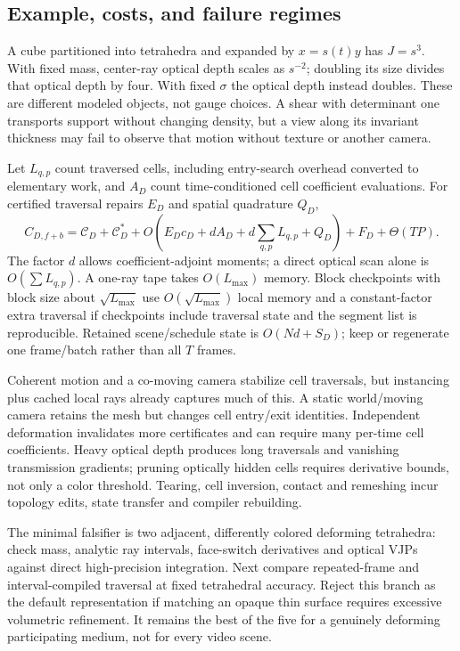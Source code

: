 \documentclass[10pt,letterpaper]{article}
\theoremstyle{remark}\newtheorem{counterexample}[proposition]{Counterexample}
\newcommand{\cost}{\mathcal C}
\begin{document}
\subsection{Example, costs, and failure regimes}
A cube partitioned into tetrahedra and expanded by $x=s(t)y$ has $J=s^3$. With fixed mass, center-ray optical depth scales as $s^{-2}$; doubling its size divides that optical depth by four. With fixed $\sigma$ the optical depth instead doubles. These are different modeled objects, not gauge choices. A shear with determinant one transports support without changing density, but a view along its invariant thickness may fail to observe that motion without texture or another camera.

Let $L_{q,p}$ count traversed cells, including entry-search overhead converted to elementary work, and $A_D$ count time-conditioned cell coefficient evaluations. For certified traversal repairs $E_D$ and spatial quadrature $Q_D$,
\begin{equation}
 C_{D,f+b}=\cost_D+\cost_D^*+O(E_Dc_D+dA_D+d\sum_{q,p}L_{q,p}+Q_D)
 +F_D+\Theta(TP). \label{eq:costD}
\end{equation}
The factor $d$ allows coefficient-adjoint moments; a direct optical scan alone is $O(\sum L_{q,p})$. A one-ray tape takes $O(L_{\max})$ memory. Block checkpoints with block size about $\sqrt{L_{\max}}$ use $O(\sqrt{L_{\max}})$ local memory and a constant-factor extra traversal if checkpoints include traversal state and the segment list is reproducible. Retained scene/schedule state is $O(Nd+S_D)$; keep or regenerate one frame/batch rather than all $T$ frames.

Coherent motion and a co-moving camera stabilize cell traversals, but instancing plus cached local rays already captures much of this. A static world/moving camera retains the mesh but changes cell entry/exit identities. Independent deformation invalidates more certificates and can require many per-time cell coefficients. Heavy optical depth produces long traversals and vanishing transmission gradients; pruning optically hidden cells requires derivative bounds, not only a color threshold. Tearing, cell inversion, contact and remeshing incur topology edits, state transfer and compiler rebuilding.

The minimal falsifier is two adjacent, differently colored deforming tetrahedra: check mass, analytic ray intervals, face-switch derivatives and optical VJPs against direct high-precision integration. Next compare repeated-frame and interval-compiled traversal at fixed tetrahedral accuracy. Reject this branch as the default representation if matching an opaque thin surface requires excessive volumetric refinement. It remains the best of the five for a genuinely deforming participating medium, not for every video scene.
\end{document}
